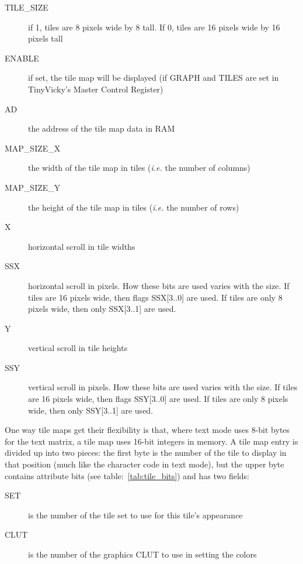 \begin{description}
    \item[TILE\_SIZE] if 1, tiles are 8 pixels wide by 8 tall. If 0, tiles are 16 pixels wide by 16 pixels tall

    \item[ENABLE] if set, the tile map will be displayed (if GRAPH and TILES are set in TinyVicky's Master Control Register)

    \item[AD] the address of the tile map data in RAM

    \item[MAP\_SIZE\_X] the width of the tile map in tiles ({\it i.e.} the number of columns)

    \item[MAP\_SIZE\_Y] the height of the tile map in tiles ({\it i.e.} the number of rows)

    \item[X] horizontal scroll in tile widths

    \item[SSX] horizontal scroll in pixels. How these bits are used varies with the size. If tiles are 16 pixels wide, then flags SSX[3..0] are used. If tiles are only 8 pixels wide, then only SSX[3..1] are used.

    \item[Y] vertical scroll in tile heights

    \item[SSY] vertical scroll in pixels. How these bits are used varies with the size. If tiles are 16 pixels wide, then flags SSY[3..0] are used. If tiles are only 8 pixels wide, then only SSY[3..1] are used.
\end{description}

One way tile maps get their flexibility is that, where text mode uses 8-bit bytes for the text matrix, a tile map uses 16-bit integers in memory. A tile map entry is divided up into two pieces: the first byte is the number of the tile to display in that position (much like the character code in text mode), but the upper byte contains attribute bits (see table:~\ref{tab:tile_bits}) and has two fields:

\begin{description}
    \item[SET] is the number of the tile set to use for this tile's appearance

    \item[CLUT] is the number of the graphics CLUT to use in setting the colors
\end{description}

